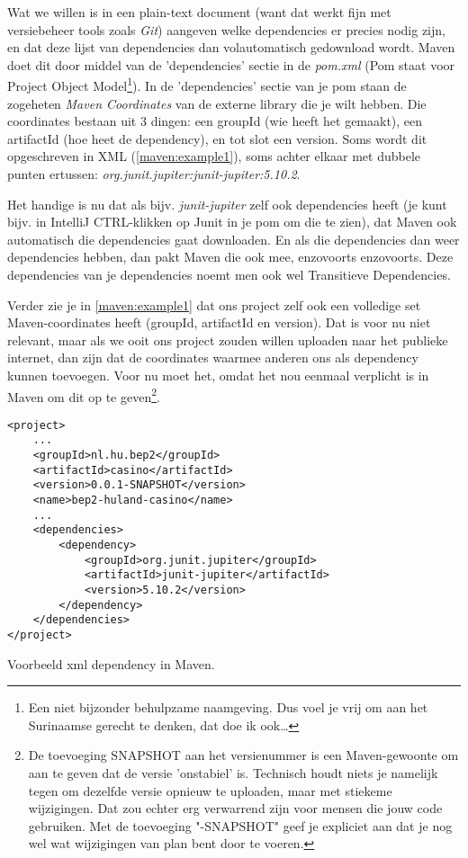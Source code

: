 Wat we willen is in een plain-text document (want dat werkt fijn met versiebeheer tools zoals \textit{Git}) aangeven welke
dependencies er precies nodig zijn, en dat deze lijst van dependencies dan volautomatisch gedownload wordt. Maven doet dit door
middel van de 'dependencies' sectie in de \textit{pom.xml} (Pom staat voor Project Object Model\footnote{
    Een niet bijzonder behulpzame naamgeving. Dus voel je vrij om aan het Surinaamse gerecht te denken, dat doe ik ook\ldots }).
In de 'dependencies' sectie van je pom staan de zogeheten \emph{Maven Coordinates} van de externe library die je wilt hebben.
Die coordinates bestaan uit 3 dingen: een groupId (wie heeft het gemaakt), een artifactId (hoe heet de dependency), 
en tot slot een version. Soms wordt dit opgeschreven in XML (\ref{maven:example1}), soms achter elkaar met dubbele punten ertussen:
\textit{org.junit.jupiter:junit-jupiter:5.10.2}. 

Het handige is nu dat als bijv. \textit{junit-jupiter} zelf ook dependencies heeft (je kunt bijv. in IntelliJ CTRL-klikken op Junit in je pom om die te zien), dat
Maven ook automatisch die dependencies gaat downloaden. En als die dependencies dan weer dependencies hebben, dan pakt Maven die ook mee,
enzovoorts enzovoorts. Deze dependencies van je dependencies noemt men ook wel Transitieve Dependencies.

Verder zie je in \ref{maven:example1} dat ons project zelf ook een volledige set Maven-coordinates heeft
(groupId, artifactId en version). Dat is voor nu niet relevant, maar als we ooit ons project zouden willen 
uploaden naar het publieke internet, dan zijn dat de coordinates waarmee anderen ons als dependency
kunnen toevoegen. Voor nu moet het, omdat het nou eenmaal verplicht is in Maven om dit op te geven\footnote{
    De toevoeging SNAPSHOT aan het versienummer is een Maven-gewoonte om aan te geven dat de versie 'onstabiel'
    is. Technisch houdt niets je namelijk tegen om dezelfde versie opnieuw te uploaden, maar met stiekeme
    wijzigingen. Dat zou echter erg verwarrend zijn voor mensen die jouw code gebruiken. Met de toevoeging
    "-SNAPSHOT" geef je expliciet aan dat je nog wel wat wijzigingen van plan bent door te voeren.
}.

\begin{listing}[H]
    \begin{verbatim}
<project>
    ...
    <groupId>nl.hu.bep2</groupId>
    <artifactId>casino</artifactId>
    <version>0.0.1-SNAPSHOT</version>
    <name>bep2-huland-casino</name>
    ...
    <dependencies>
        <dependency>
            <groupId>org.junit.jupiter</groupId>
            <artifactId>junit-jupiter</artifactId>
            <version>5.10.2</version>
        </dependency>
    </dependencies>
</project>
    \end{verbatim}
    \caption{Voorbeeld xml dependency in Maven.}
    \label{maven:example1}
\end{listing}

